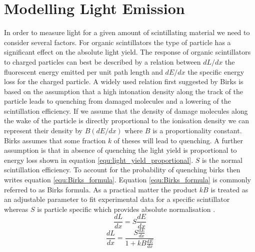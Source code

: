 \section{Modelling Light Emission}\label{sec:geant4Simulation_ModellingLightEmission}
In order to measure light for a given amount of scintillating material we need to consider several factors. For organic scintillators the type of particle has a significant effect on the absolute light yield. The response of organic scintillators to charged particles can best be described by a relation between $dL/dx$ the fluorescent energy emitted per unit path length and $dE/dx$ the specific energy loss for the charged particle.  A widely used relation first suggested by Birks \cite{birks_1964} is based on the assumption that a high intonation density along the track of the particle leads to quenching from damaged molecules and a lowering of the scintillation efficiency. If we assume that the density of damage molecules along the wake of the particle is directly proportional to the ionisation density we can represent their density by $B(dE/dx)$ where $B$ is a proportionality constant. Birks assumes that some fraction $k$ of theses will lead to quenching\cite{knoll_2010}. A further assumption is that in absence of quenching the light yield is proportional to energy loss shown in equation \ref{equ:light_yield_proportional}. $S$ is the normal scintillation efficiency. To account for the probability of quenching birks then writes equation \ref{equ:Birks_formula}. Equation \ref{equ:Birks_formula} is commonly referred to as Birks formula. As a practical matter the product $kB$ is treated as an adjustable parameter to fit experimental data for a specific scintillator whereas $S$ is particle specific which provides absolute normalisation \cite{knoll_2010}.  
\begin{equation}
\frac{dL}{dx} = S\frac{dE}{dx}
\label{equ:light_yield_proportional}
\end{equation}
\begin{equation}
\frac{dL}{dx} = \frac{S\frac{dE}{dx}}{1 + kB \frac{dE}{dx}}
\label{equ:Birks_formula}
\end{equation}
